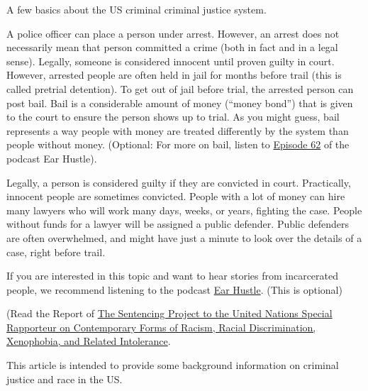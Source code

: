 \documentclass[assignment02_Solutions]{subfiles}
\begin{document}
A few basics about the US criminal criminal justice system. 

A police officer can place a person under arrest. However, an arrest does not necessarily mean that person committed a crime (both in fact and in a legal sense). Legally, someone is considered innocent until proven guilty in court. However, arrested people are often held in jail for months before trail (this is called pretrial detention). To get out of jail before trial, the arrested person can post bail. Bail is a considerable amount of money (``money bond'') that is given to the court to ensure the person shows up to trial. As you might guess, bail represents a way people with money are treated differently by the system than people without money.  (Optional: For more on bail, listen to \href{https://www.earhustlesq.com/episodes/2021/9/22/do-it-movin}{Episode 62} of the podcast Ear Hustle). 

Legally, a person is considered guilty if they are convicted in court. Practically, innocent people are sometimes convicted. People with a lot of money can hire many lawyers who will work many days, weeks, or years, fighting the case. People without funds for a lawyer will be assigned a public defender. Public defenders are often overwhelmed, and might have just a minute to look over the details of a case, right before trail.

If you are interested in this topic and want to hear stories from incarcerated people, we recommend listening to the podcast \href{https://www.earhustlesq.com/}{Ear Hustle}. (This is optional) 


\begin{exercise}
\bes
\item (Read the Report of \href{https://www.sentencingproject.org/publications/un-report-on-racial-disparities/}{The Sentencing Project to the United Nations Special Rapporteur on Contemporary Forms of Racism, Racial Discrimination, Xenophobia, and Related Intolerance}. 

This article is intended to provide some background information on criminal justice and race in the US. 
\ees
\end{exercise}
\end{document}
